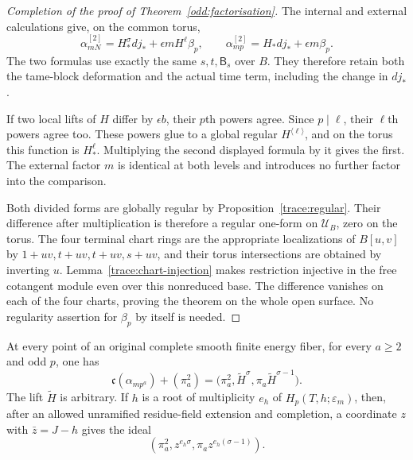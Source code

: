 \begin{proof}[Completion of the proof of Theorem~\ref{odd:factorisation}]
The internal and external calculations give, on the common torus,
\[
 \alpha_{mN}^{[2]}=H_*^\sigma dj_*+\epsilon mH^\ell\beta_p,
 \qquad
 \alpha_{mp}^{[2]}=H_*dj_*+\epsilon m\beta_p.
\]
The two formulas use exactly the same $s,t,\mathsf B_s$ over $B$.
They therefore retain both the tame-block deformation and the
actual time term, including the change in $dj_*$.

If two local lifts of $H$ differ by $\epsilon b$, their $p$th
powers agree. Since $p\mid\ell$, their $\ell$th powers agree too.
These powers glue to a global regular $H^{\langle\ell\rangle}$,
and on the torus this function is $H_*^\ell$. Multiplying the
second displayed formula by it gives the first. The external
factor $m$ is identical at both levels and introduces no further
factor into the comparison.

Both divided forms are globally regular by
Proposition~\ref{trace:regular}. Their difference after multiplication
is therefore a regular one-form on $\mathcal U_B$, zero on the torus.
The four terminal chart rings are the appropriate localizations of
$B[u,v]$ by $1+uv,t+uv,t+uv,s+uv$, and their torus intersections
are obtained by inverting $u$. Lemma~\ref{trace:chart-injection}
makes restriction injective in the free cotangent module even
over this nonreduced base. The difference vanishes on each of
the four charts, proving the theorem on the whole open surface.
No regularity assertion for $\beta_p$ by itself is needed.
\end{proof}

\begin{corollary}
\label{odd:ideal}
At every point of an original complete smooth finite energy fiber,
for every $a\ge2$ and odd $p$, one has
\begin{equation}
 \mathfrak c(\alpha_{mp^a})+(\pi_a^2)
 =\bigl(\pi_a^2,\widetilde H^\sigma,
                 \pi_a\widetilde H^{\sigma-1}\bigr).
 \label{odd:ideal-equation}
\end{equation}
The lift $\widetilde H$ is arbitrary. If $h$ is a root of multiplicity
$e_h$ of $H_p(T,h;\varepsilon_m)$, then, after an allowed unramified
residue-field extension and completion, a coordinate $z$ with
$\bar z=J-h$ gives the ideal
\begin{equation}
 (\pi_a^2,z^{e_h\sigma},\pi_a z^{e_h(\sigma-1)}).
 \label{odd:multiple-root}
\end{equation}
\end{corollary}

